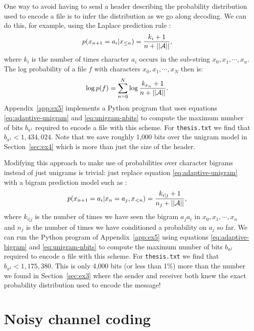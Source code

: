 \documentclass[10pt,a4paper,oneside,onecolumn]{article}
\newcommand*{\thesisTXT}{{\tt thesis.txt}\xspace}
\newcommand*{\norm}[1]{\ensuremath{\left|\left|#1\right|\right|}}
\newcommand*{\textapprox}{\raisebox{0.5ex}{\texttildelow}}
\begin{document}
One way to avoid having to send a header describing the probability distribution
used to encode a file is to infer the distribution as we go along decoding. We
can do this, for example, using the Laplace prediction rule
\cite[p.~2]{it-assign}:
\begin{equation}
    p(x_{n+1}=a_i|x_{\le n}) = {k_i + 1 \over n + \norm{\mathcal{A}}},
\end{equation}
where $k_i$ is the number of times character $a_i$ occurs in the sub-string
$x_0, x_1, \cdots, x_n$.
The log probability of a file $f$ with characters $x_0, x_1, \cdots, x_N$ then
is:
\begin{equation}\label{eq:adaptive-unigram}
    \log p(f) =
    \sum\limits_{n = 0}^N \log {k_{x_n} + 1 \over n + \norm{\mathcal{A}}}.
\end{equation}
Appendix~\ref{app:ex5} implements a Python program that uses equations
\eqref{eq:adaptive-unigram} and \eqref{eq:unigram-nbits} to compute the maximum
number of bits $b_{a^1}$ required to encode a file with this scheme. For
\thesisTXT we find that $b_{a^1} < 1,434,024$. Note that we save roughly 1,000
bits over the unigram model in Section~\ref{sec:ex4} which is more than just the
size of the header.

Modifying this approach to make use of probabilities over character bigrams
instead of just unigrams is trivial: just replace equation
\eqref{eq:adaptive-unigram} with a bigram prediction model such as
\cite[p.~3]{it-assign}:
\begin{equation}\label{eq:adaptive-bigram}
    p(x_{n+1}=a_i|x_{n} = a_j, x_{<n})
    = {k_{i|j} + 1 \over n_j + \norm{\mathcal{A}}},
\end{equation}
where $k_{i|j}$ is the number of times we have seen the bigram $a_ja_i$ in
$x_0, x_1, \cdots, x_n$ and $n_j$ is the number of times we have conditioned a
probability on $a_j$ so far.
We can run the Python program of Appendix~\ref{app:ex5} using equations
\eqref{eq:adaptive-bigram} and \eqref{eq:unigram-nbits} to compute the maximum
number of bits $b_{a^2}$ required to encode a file with this scheme. For
\thesisTXT we find that $b_{a^2} < 1,175,380$. This is only \textapprox 4,000
bits (or less than 1\%) more than the number we found in Section~\ref{sec:ex3}
where the sender and receiver both knew the exact probability distribution used
to encode the message!


\part{Noisy channel coding}
\end{document}
